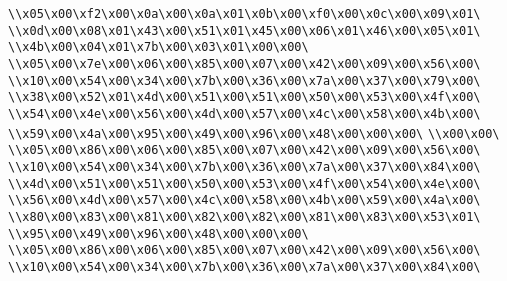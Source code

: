 \verb|\\x05\x00\xf2\x00\x0a\x00\x0a\x01\x0b\x00\xf0\x00\x0c\x00\x09\x01\|\newline
\verb|\\x0d\x00\x08\x01\x43\x00\x51\x01\x45\x00\x06\x01\x46\x00\x05\x01\|\newline
\verb|\\x4b\x00\x04\x01\x7b\x00\x03\x01\x00\x00\|\newline
\verb|\\x05\x00\x7e\x00\x06\x00\x85\x00\x07\x00\x42\x00\x09\x00\x56\x00\|\newline
\verb|\\x10\x00\x54\x00\x34\x00\x7b\x00\x36\x00\x7a\x00\x37\x00\x79\x00\|\newline
\verb|\\x38\x00\x52\x01\x4d\x00\x51\x00\x51\x00\x50\x00\x53\x00\x4f\x00\|\newline
\verb|\\x54\x00\x4e\x00\x56\x00\x4d\x00\x57\x00\x4c\x00\x58\x00\x4b\x00\|\newline
\verb|\\x59\x00\x4a\x00\x95\x00\x49\x00\x96\x00\x48\x00\x00\x00\|\newline
\verb|\\x00\x00\|\newline
\verb|\\x05\x00\x86\x00\x06\x00\x85\x00\x07\x00\x42\x00\x09\x00\x56\x00\|\newline
\verb|\\x10\x00\x54\x00\x34\x00\x7b\x00\x36\x00\x7a\x00\x37\x00\x84\x00\|\newline
\verb|\\x4d\x00\x51\x00\x51\x00\x50\x00\x53\x00\x4f\x00\x54\x00\x4e\x00\|\newline
\verb|\\x56\x00\x4d\x00\x57\x00\x4c\x00\x58\x00\x4b\x00\x59\x00\x4a\x00\|\newline
\verb|\\x80\x00\x83\x00\x81\x00\x82\x00\x82\x00\x81\x00\x83\x00\x53\x01\|\newline
\verb|\\x95\x00\x49\x00\x96\x00\x48\x00\x00\x00\|\newline
\verb|\\x05\x00\x86\x00\x06\x00\x85\x00\x07\x00\x42\x00\x09\x00\x56\x00\|\newline
\verb|\\x10\x00\x54\x00\x34\x00\x7b\x00\x36\x00\x7a\x00\x37\x00\x84\x00\|\newline
